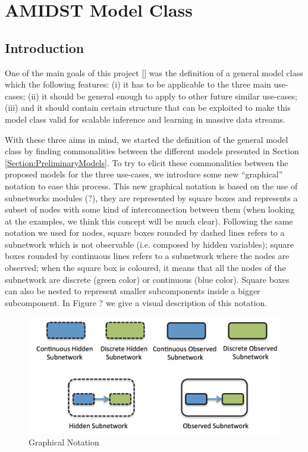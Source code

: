 \section{AMIDST Model Class}

\subsection{Introduction}

One of the main goals of this project [] was the definition of a general model class which the following features: (i) it has to be applicable to the three main use-cases; (ii) it should be general enough to apply to other future similar use-cases;  (iii) and it should contain certain structure that can be exploited to make this model class valid for scalable inference and learning in massive data streams. 

With these three aims in mind,  we started the definition of the general model class by finding commonalities between the different models presented in Section \ref{Section:PreliminaryModels}.  To try to elicit these commonalities between the proposed models for the three use-cases, we  introduce some new ``graphical'' notation to ease this process. This new graphical notation is based on the use of subnetworks modules (?), they are represented by square boxes and represents a subset of nodes with some kind of interconnection between them (when looking at the examples, we think this concept will be much clear). Following the same notation we used for nodes, square boxes rounded by dashed lines refers to a subnetwork which is not observable (i.e. composed by hidden variables); square boxes rounded by continuous lines refers to a subnetwork where the nodes are observed; when the square box is coloured, it means that all the nodes of the subnetwork are discrete (green color) or continuous (blue color). Square boxes can also be nested to represent smaller subcomponents inside a bigger subcomponent. In Figure ? we give a visual description of this notation. 

\begin{figure}
\begin{center}
\caption{\label{Figure:ModelClass0} Graphical Notation}
\includegraphics[scale=0.4]{./figures/ModelClass0}
\end{center}
\end{figure}

